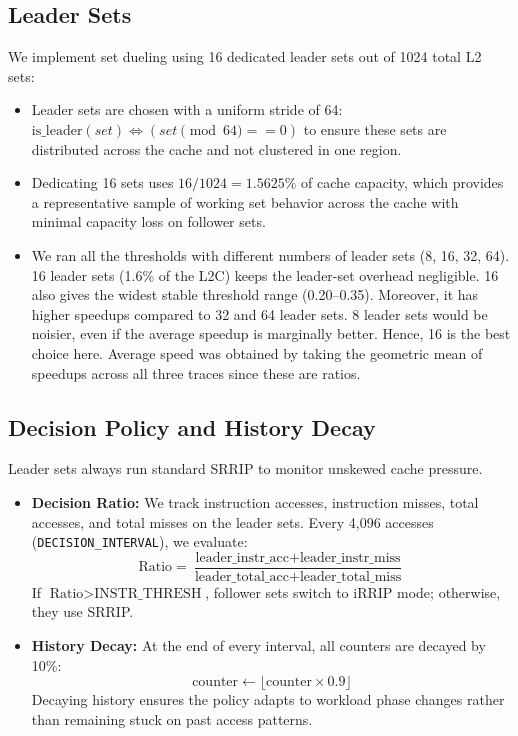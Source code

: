 \documentclass[11pt,a4paper]{article}
\begin{document}
\subsection{Leader Sets}
We implement set dueling using 16 dedicated leader sets out of 1024 total L2 sets:
\begin{itemize}
    \item Leader sets are chosen with a uniform stride of 64: $\text{is\_leader}(set) \iff (set \pmod{64} == 0)$ to ensure these sets are distributed across the cache and not clustered in one region.
    \item Dedicating 16 sets uses $16 / 1024 = 1.5625\%$ of cache capacity, which provides a representative sample of working set behavior across the cache with minimal capacity loss on follower sets.
    \item We ran all the thresholds with different numbers of leader sets (8, 16, 32, 64). 16 leader sets (1.6\% of the L2C) keeps the leader-set overhead negligible. 16 also gives the widest stable threshold range (0.20--0.35). Moreover, it has higher speedups compared to 32 and 64 leader sets. 8 leader sets would be noisier, even if the average speedup is marginally better. Hence, 16 is the best choice here. Average speed was obtained by taking the geometric mean of speedups across all three traces since these are ratios.

\end{itemize}

\subsection{Decision Policy and History Decay}
Leader sets always run standard SRRIP to monitor unskewed cache pressure.
\begin{itemize}
    \item \textbf{Decision Ratio:} We track instruction accesses, instruction misses, total accesses, and total misses on the leader sets. Every 4,096 accesses (\texttt{DECISION\_INTERVAL}), we evaluate:
    \begin{equation}
    \text{Ratio} = \frac{\text{leader\_instr\_acc} + \text{leader\_instr\_miss}}{\text{leader\_total\_acc} + \text{leader\_total\_miss}}
    \end{equation}
    If $\text{Ratio} > \text{INSTR\_THRESH}$, follower sets switch to iRRIP mode; otherwise, they use SRRIP.
    \item \textbf{History Decay:} At the end of every interval, all counters are decayed by 10\%:
    $$\text{counter} \leftarrow \lfloor \text{counter} \times 0.9 \rfloor$$
    Decaying history ensures the policy adapts to workload phase changes rather than remaining stuck on past access patterns. 
\end{itemize}
\end{document}
